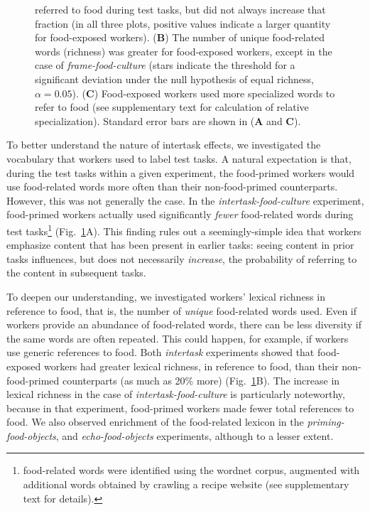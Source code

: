 \documentclass[12pt]{article}
\begin{document}
\begin{figure}
{		referred to food during test tasks, 
		but did not always increase that fraction (in all three plots,
		positive values indicate a larger quantity for food-exposed workers).
		(\textbf{B}) The number of unique food-related
		words (richness) was greater for food-exposed workers, except in the 
		case of \textit{frame-food-culture} (stars indicate the threshold
		for a significant deviation under the null hypothesis of equal 
		richness, $\alpha=0.05$). 
		(\textbf{C}) Food-exposed
		workers used more specialized words to refer to food (see 
		supplementary text for calculation of relative specialization).
		Standard error bars are shown in (\textbf{A} and \textbf{C}).
	}
	\label{fig:specificity}
\end{figure}

To better understand the nature of 
intertask effects, we investigated the vocabulary
that workers used to label test tasks. A natural expectation is that, during
the test tasks within
a given experiment, the food-primed workers would use food-related words 
more often than their non-food-primed counterparts.  However, this was not 
generally 
the case. In the \textit{intertask-food-culture} experiment, food-primed
workers actually used significantly \textit{fewer} food-related words 
during test tasks\footnote{
	food-related words were identified using the wordnet corpus, 
	augmented with additional words obtained by crawling a recipe website 
	(see supplementary text for details).
} (Fig.~\ref{fig:specificity}A).  This finding
rules out a seemingly-simple idea that workers emphasize
content that has been present in earlier tasks: seeing content in prior tasks
influences, but does not necessarily \textit{increase}, the probability of 
referring to the content in subsequent tasks.

To deepen our understanding, we investigated workers' lexical richness in 
reference to food, that is, the number of \textit{unique} food-related words
used.  Even if workers provide an abundance of food-related words, there
can be less diversity if the same words are often repeated.  
This could happen, for example, if workers use generic references 
to food.
Both \textit{intertask} experiments showed that food-exposed workers had 
greater lexical richness, in reference to food, than their non-food-primed 
counterparts (as much as 20\% more) (Fig.~\ref{fig:specificity}B).  
The increase in lexical richness in the case of 
\textit{intertask-food-culture} is particularly noteworthy, because in that 
experiment, food-primed workers made fewer total references to food.  
We also observed enrichment of the food-related lexicon in the 
\textit{priming-food-objects}, and \textit{echo-food-objects} experiments, 
although to a lesser extent.
\end{document}
